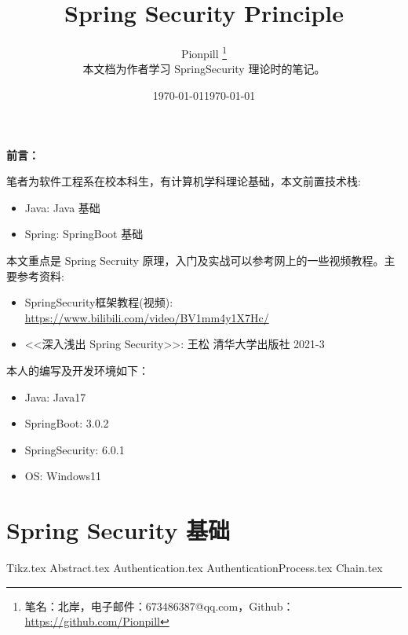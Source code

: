 \documentclass{PionpillNote-book}
\title{Spring Security Principle}
\author{
    Pionpill \footnote{笔名：北岸，电子邮件：673486387@qq.com，Github：\url{https://github.com/Pionpill}} \\
    本文档为作者学习 SpringSecurity 理论时的笔记。\\
}
\date{\today}
\begin{document}
\pagestyle{plain}
\maketitle

\noindent\textbf{前言：}

笔者为软件工程系在校本科生，有计算机学科理论基础，本文前置技术栈:
\begin{itemize}
    \item Java: Java 基础
    \item Spring: SpringBoot 基础
\end{itemize}

本文重点是 Spring Secruity 原理，入门及实战可以参考网上的一些视频教程。主要参考资料:
\begin{itemize}
    \item SpringSecurity框架教程(视频): \url{https://www.bilibili.com/video/BV1mm4y1X7Hc/}
    \item <<深入浅出 Spring Security>>: 王松 清华大学出版社 2021-3
\end{itemize}

本人的编写及开发环境如下：
\begin{itemize}
    \item Java: Java17
    \item SpringBoot: 3.0.2
    \item SpringSecurity: 6.0.1
    \item OS: Windows11
\end{itemize}

\date{\today}
\newpage

\tableofcontents

\newpage

\setcounter{page}{1} 
\pagestyle{fancy}

\chapter{Spring Security 基础}
{Tikz.tex}
{Abstract.tex}
{Authentication.tex}
{AuthenticationProcess.tex}
{Chain.tex}
\end{document}
